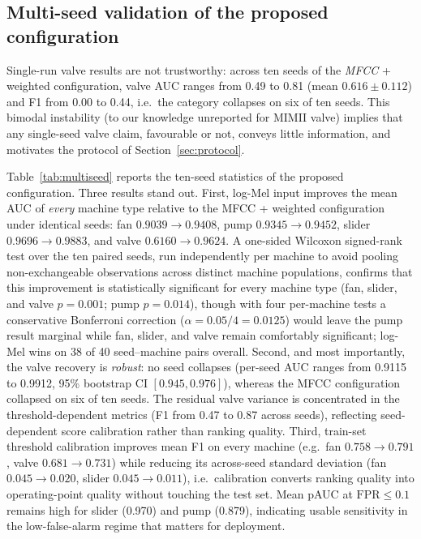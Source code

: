 \documentclass[review,nopreprintline]{elsarticle}
\begin{document}
\subsection{Multi-seed validation of the proposed configuration}
\label{sec:multiseed}

Single-run valve results are not trustworthy: across ten seeds of the \emph{MFCC} + weighted configuration, valve AUC ranges from 0.49 to 0.81 (mean $0.616\pm0.112$) and F1 from 0.00 to 0.44, i.e.\ the category collapses on six of ten seeds. This bimodal instability (to our knowledge unreported for MIMII valve) implies that any single-seed valve claim, favourable or not, conveys little information, and motivates the protocol of Section~\ref{sec:protocol}.

Table~\ref{tab:multiseed} reports the ten-seed statistics of the proposed configuration. Three results stand out. First, log-Mel input improves the mean AUC of \emph{every} machine type relative to the MFCC + weighted configuration under identical seeds: fan $0.9039\!\to\!0.9408$, pump $0.9345\!\to\!0.9452$, slider $0.9696\!\to\!0.9883$, and valve $0.6160\!\to\!0.9624$. A one-sided Wilcoxon signed-rank test over the ten paired seeds, run independently per machine to avoid pooling non-exchangeable observations across distinct machine populations, confirms that this improvement is statistically significant for every machine type (fan, slider, and valve $p=0.001$; pump $p=0.014$), though with four per-machine tests a conservative Bonferroni correction ($\alpha=0.05/4=0.0125$) would leave the pump result marginal while fan, slider, and valve remain comfortably significant; log-Mel wins on 38 of 40 seed--machine pairs overall. Second, and most importantly, the valve recovery is \emph{robust}: no seed collapses (per-seed AUC ranges from 0.9115 to 0.9912, 95\% bootstrap CI $[0.945, 0.976]$), whereas the MFCC configuration collapsed on six of ten seeds. The residual valve variance is concentrated in the threshold-dependent metrics (F1 from 0.47 to 0.87 across seeds), reflecting seed-dependent score calibration rather than ranking quality. Third, train-set threshold calibration improves mean F1 on every machine (e.g.\ fan $0.758\!\to\!0.791$, valve $0.681\!\to\!0.731$) while reducing its across-seed standard deviation (fan $0.045\!\to\!0.020$, slider $0.045\!\to\!0.011$), i.e.\ calibration converts ranking quality into operating-point quality without touching the test set. Mean pAUC at $\mathrm{FPR}\le0.1$ remains high for slider (0.970) and pump (0.879), indicating usable sensitivity in the low-false-alarm regime that matters for deployment.
\end{document}
